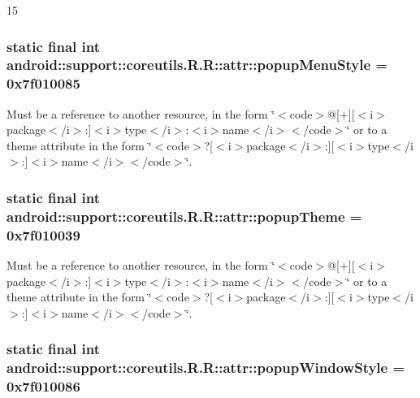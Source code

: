 15\hypertarget{classandroid_1_1support_1_1coreutils_1_1_r_1_1attr_f3e50d0021f11e1233f7d5b1b6b16ef3}{
\subsubsection[{popupMenuStyle}]{\setlength{\rightskip}{0pt plus 5cm}static final int android::support::coreutils.R.R::attr::popupMenuStyle = 0x7f010085}}
\label{classandroid_1_1support_1_1coreutils_1_1_r_1_1attr_f3e50d0021f11e1233f7d5b1b6b16ef3}


Must be a reference to another resource, in the form \char`\"{}$<$code$>$@\mbox{[}+\mbox{]}\mbox{[}$<$i$>$package$<$/i$>$:\mbox{]}$<$i$>$type$<$/i$>$:$<$i$>$name$<$/i$>$$<$/code$>$\char`\"{} or to a theme attribute in the form \char`\"{}$<$code$>$?\mbox{[}$<$i$>$package$<$/i$>$:\mbox{]}\mbox{[}$<$i$>$type$<$/i$>$:\mbox{]}$<$i$>$name$<$/i$>$$<$/code$>$\char`\"{}. \hypertarget{classandroid_1_1support_1_1coreutils_1_1_r_1_1attr_558addf3755d1919c7add9fbe35d2d6a}{
\subsubsection[{popupTheme}]{\setlength{\rightskip}{0pt plus 5cm}static final int android::support::coreutils.R.R::attr::popupTheme = 0x7f010039}}
\label{classandroid_1_1support_1_1coreutils_1_1_r_1_1attr_558addf3755d1919c7add9fbe35d2d6a}


Must be a reference to another resource, in the form \char`\"{}$<$code$>$@\mbox{[}+\mbox{]}\mbox{[}$<$i$>$package$<$/i$>$:\mbox{]}$<$i$>$type$<$/i$>$:$<$i$>$name$<$/i$>$$<$/code$>$\char`\"{} or to a theme attribute in the form \char`\"{}$<$code$>$?\mbox{[}$<$i$>$package$<$/i$>$:\mbox{]}\mbox{[}$<$i$>$type$<$/i$>$:\mbox{]}$<$i$>$name$<$/i$>$$<$/code$>$\char`\"{}. \hypertarget{classandroid_1_1support_1_1coreutils_1_1_r_1_1attr_766cc5d736f71f6960a9e2333d38bfa3}{
\subsubsection[{popupWindowStyle}]{\setlength{\rightskip}{0pt plus 5cm}static final int android::support::coreutils.R.R::attr::popupWindowStyle = 0x7f010086}}
\label{classandroid_1_1support_1_1coreutils_1_1_r_1_1attr_766cc5d736f71f6960a9e2333d38bfa3}


